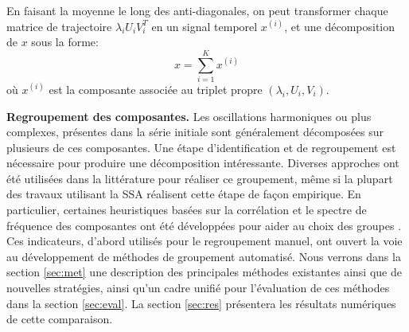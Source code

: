 \documentclass{gretsi}
\def\HH{\mathcal H}
\begin{document}
En faisant la moyenne le long des anti-diagonales, on peut transformer chaque matrice de trajectoire $\lambda_iU_iV_i^T$  en un signal temporel $x^{(i)}$, et une décomposition de $x$ sous la forme:
\vspace{-.15cm}
\begin{equation}
    x = \sum_{i=1}^K x^{(i)}
\end{equation}
où $x^{(i)} $ est la composante associée au triplet propre $(\lambda_i, U_i, V_i)$.




\begin{sloppypar}
\noindent\textbf{Regroupement des composantes.}\label{sub:grp}
Les oscillations harmoniques ou plus complexes, présentes dans la série initiale sont généralement décomposées sur plusieurs de ces composantes.
Une étape d'identification et de regroupement est nécessaire pour produire une décomposition intéressante.
Diverses approches ont été utilisées dans la littérature pour réaliser ce groupement, même si la plupart des travaux utilisant la SSA réalisent cette étape de façon empirique.
En particulier, certaines heuristiques basées sur la corrélation et le spectre de fréquence des composantes ont été développées pour aider au choix des groupes \cite{Golyandina_10_ssa}.
Ces indicateurs, d'abord utilisés pour le regroupement manuel, ont ouvert la voie au développement de méthodes de groupement automatisé.
Nous verrons dans la section \ref{sec:met} une description des principales méthodes existantes ainsi que de nouvelles stratégies, ainsi qu'un cadre unifié pour l'évaluation de ces méthodes dans la section \ref{sec:eval}.
La section \ref{sec:res} présentera les résultats numériques de cette comparaison.
\end{sloppypar}
\end{document}
